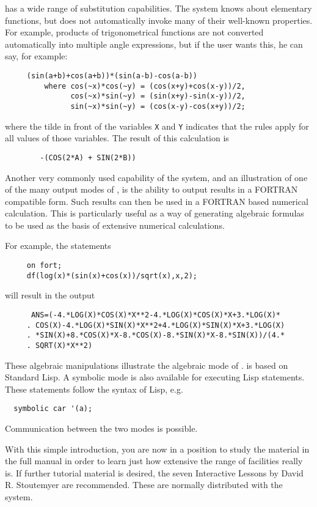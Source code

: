 {\REDUCE} has a wide range of substitution capabilities. The system knows
about elementary functions, but does not automatically invoke many of their
well-known properties. For example, products of trigonometrical functions
are not converted automatically into multiple angle expressions, but if the
user wants this, he can say, for example:
\begin{verbatim}
     (sin(a+b)+cos(a+b))*(sin(a-b)-cos(a-b))
         where cos(~x)*cos(~y) = (cos(x+y)+cos(x-y))/2,
               cos(~x)*sin(~y) = (sin(x+y)-sin(x-y))/2,
               sin(~x)*sin(~y) = (cos(x-y)-cos(x+y))/2;
\end{verbatim}
where the tilde in front of the variables {\tt X} and {\tt Y} indicates
that the rules apply for all values of those variables.
The result of this calculation is
\begin{verbatim}
        -(COS(2*A) + SIN(2*B))
\end{verbatim}
Another very commonly used capability of the system, and an illustration
of one of the many output modes of {\REDUCE}, is the ability to output
results in a FORTRAN compatible form.  Such results can then be used in a
FORTRAN based numerical calculation.  This is particularly useful as a way
of generating algebraic formulas to be used as the basis of extensive
numerical calculations.

For example, the statements
\begin{verbatim}
     on fort;
     df(log(x)*(sin(x)+cos(x))/sqrt(x),x,2);
\end{verbatim}
will result in the output
\begin{verbatim}
      ANS=(-4.*LOG(X)*COS(X)*X**2-4.*LOG(X)*COS(X)*X+3.*LOG(X)*
     . COS(X)-4.*LOG(X)*SIN(X)*X**2+4.*LOG(X)*SIN(X)*X+3.*LOG(X)
     . *SIN(X)+8.*COS(X)*X-8.*COS(X)-8.*SIN(X)*X-8.*SIN(X))/(4.*
     . SQRT(X)*X**2)
\end{verbatim}
These algebraic manipulations illustrate the algebraic mode of {\REDUCE}.
{\REDUCE} is based on Standard Lisp. A symbolic mode is also available for
executing Lisp statements. These statements follow the syntax of Lisp,
e.g.
\begin{verbatim}
  symbolic car '(a);
\end{verbatim}
Communication between the two modes is possible.

With this simple introduction, you are now in a position to study the
material in the full {\REDUCE} manual in order to learn just how extensive
the range of facilities really is.  If further tutorial material is
desired, the seven {\REDUCE} Interactive Lessons by David R. Stoutemyer are
recommended.  These are normally distributed with the system.

